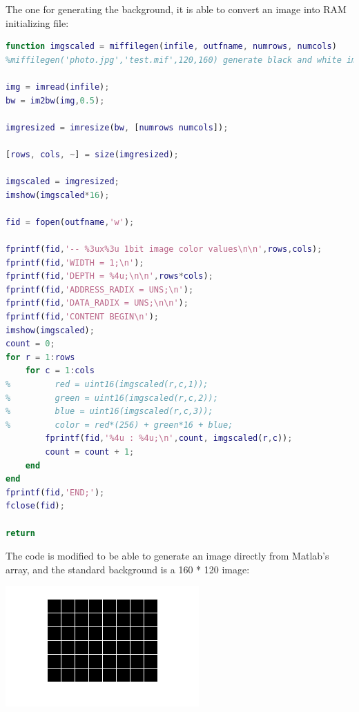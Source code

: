 \documentclass[11pt]{scrartcl}
\begin{document}
The one for generating the background, it is able to convert an image into RAM initializing file:
\begin{lstlisting}[language=Matlab]
function imgscaled = miffilegen(infile, outfname, numrows, numcols)
%miffilegen('photo.jpg','test.mif',120,160) generate black and white image.

img = imread(infile);
bw = im2bw(img,0.5);

imgresized = imresize(bw, [numrows numcols]);

[rows, cols, ~] = size(imgresized);

imgscaled = imgresized;
imshow(imgscaled*16);

fid = fopen(outfname,'w');

fprintf(fid,'-- %3ux%3u 1bit image color values\n\n',rows,cols);
fprintf(fid,'WIDTH = 1;\n');
fprintf(fid,'DEPTH = %4u;\n\n',rows*cols);
fprintf(fid,'ADDRESS_RADIX = UNS;\n');
fprintf(fid,'DATA_RADIX = UNS;\n\n');
fprintf(fid,'CONTENT BEGIN\n');
imshow(imgscaled);
count = 0;
for r = 1:rows
    for c = 1:cols
%         red = uint16(imgscaled(r,c,1));
%         green = uint16(imgscaled(r,c,2));
%         blue = uint16(imgscaled(r,c,3));
%         color = red*(256) + green*16 + blue;
        fprintf(fid,'%4u : %4u;\n',count, imgscaled(r,c));
        count = count + 1;
    end
end
fprintf(fid,'END;');
fclose(fid);

return
\end{lstlisting}

The code is modified to be able to generate an image directly from Matlab's array, and the standard background is a 160 * 120 image:
\begin{center}
\begin{minipage}[t]{\linewidth}

{
\includegraphics[scale = 1]{temp.png}
}
\end{minipage}
\medskip
\end{center}
\end{document}
